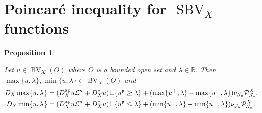 \documentclass[12pt,a4paper]{amsart}
\theoremstyle{definition}
\theoremstyle{plain}
\newtheorem{pro}[defi]{Proposition}
\newcommand{\R}{\mathbb{R}}
\newcommand{\pxu}{{\mathcal{P}^X_{\mathcal{J}_u}}}
\newcommand{\res} {\mathop{\hbox{\vrule height 7pt width .5pt depth 0pt \vrule height .5pt width 6pt depth 0pt}}\nolimits}
\newcommand{\leb}{\mathcal{L}}
\newcommand{\sbv}{\operatorname{SBV}}
\newcommand{\bv}{\operatorname{BV}}
\newcommand{\J}{\mathcal{J}}
\newcommand{\ap}{{\operatorname{ap}}}
\newcommand{\p}{{\mathfrak{p}}}
\begin{document}
\section{Poincaré inequality for \texorpdfstring{$\sbv_X$}{SBVX} functions}
\label{sec_poinc}
\begin{pro}\label{prop_maxmin}


    Let $u \in \bv_X(O)$ where $O$ is a bounded open set and $\lambda \in \R$. Then $\max\{u,\lambda \}, \min\{u,\lambda \} \in \bv_X(O)$ and
      \begin{align*}
    D_X \max \{u,\lambda\}&= (D^\ap_Xu\leb^n+D^c_Xu) \res \{u^\p \geq \lambda \}+ (\max\{u^+,\lambda \}-\max\{u^-,\lambda \} )\nu_{\J_u}\pxu ,\\
       D_X \min \{u,\lambda\}&= (D^\ap_Xu\leb^n+D^c_Xu)  \res \{u^\p \leq \lambda \}+(\min\{u^+,\lambda \}-\min\{u^-,\lambda \} )\nu_{\J_u}\pxu.
    \end{align*}
\end{pro}
\end{document}
